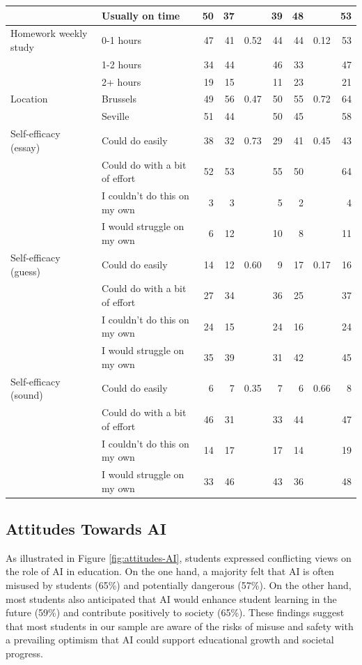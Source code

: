 \documentclass[
  11pt,
]{article}
\begin{document}
\begin{table}
\begin{tabular}[t]{llrrlrrlr}
\hline
 & Usually on time & 50 & 37 &  & 39 & 48 &  & 53\\
\hline
Homework weekly study & 0-1 hours & 47 & 41 & 0.52 & 44 & 44 & 0.12 & 53\\
\hline
 & 1-2 hours & 34 & 44 &  & 46 & 33 &  & 47\\
\hline
 & 2+ hours & 19 & 15 &  & 11 & 23 &  & 21\\
\hline
Location & Brussels & 49 & 56 & 0.47 & 50 & 55 & 0.72 & 64\\
\hline
 & Seville & 51 & 44 &  & 50 & 45 &  & 58\\
\hline
Self-efficacy (essay) & Could do easily & 38 & 32 & 0.73 & 29 & 41 & 0.45 & 43\\
\hline
 & Could do with a bit of effort & 52 & 53 &  & 55 & 50 &  & 64\\
\hline
 & I couldn't do this on my own & 3 & 3 &  & 5 & 2 &  & 4\\
\hline
 & I would struggle on my own & 6 & 12 &  & 10 & 8 &  & 11\\
\hline
Self-efficacy (guess) & Could do easily & 14 & 12 & 0.60 & 9 & 17 & 0.17 & 16\\
\hline
 & Could do with a bit of effort & 27 & 34 &  & 36 & 25 &  & 37\\
\hline
 & I couldn't do this on my own & 24 & 15 &  & 24 & 16 &  & 24\\
\hline
 & I would struggle on my own & 35 & 39 &  & 31 & 42 &  & 45\\
\hline
Self-efficacy (sound) & Could do easily & 6 & 7 & 0.35 & 7 & 6 & 0.66 & 8\\
\hline
 & Could do with a bit of effort & 46 & 31 &  & 33 & 44 &  & 47\\
\hline
 & I couldn't do this on my own & 14 & 17 &  & 17 & 14 &  & 19\\
\hline
 & I would struggle on my own & 33 & 46 &  & 43 & 36 &  & 48\\
\bottomrule
\end{tabular}
\end{table}

\subsection{Attitudes Towards AI}\label{attitudes-towards-ai}

As illustrated in Figure \ref{fig:attitudes-AI}, students expressed conflicting views on the role of AI in education. On the one hand, a majority felt that AI is often misused by students (65\%) and potentially dangerous (57\%). On the other hand, most students also anticipated that AI would enhance student learning in the future (59\%) and contribute positively to society (65\%). These findings suggest that most students in our sample are aware of the risks of misuse and safety with a prevailing optimism that AI could support educational growth and societal progress.
\end{document}
